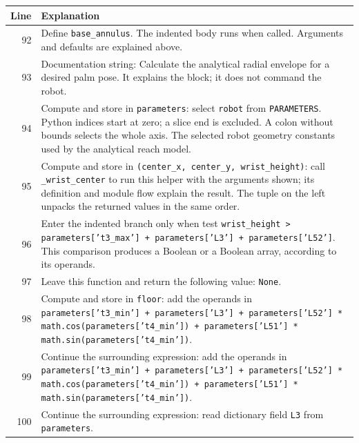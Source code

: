 \documentclass[11pt,a4paper]{book}
\begin{document}
\begin{longtable}{r p{}}

\textbf{Line} & \textbf{Explanation} \\ \hline \endhead

92 & Define \texttt{base\_annulus}. The indented body runs when called. Arguments and defaults are explained above. \\

93 & Documentation string: Calculate the analytical radial envelope for a desired palm pose. It explains the block; it does not command the robot. \\

94 & Compute and store in \texttt{parameters}: select \texttt{robot} from \texttt{PARAMETERS}. Python indices start at zero; a slice end is excluded. A colon without bounds selects the whole axis. The selected robot geometry constants used by the analytical reach model. \\

95 & Compute and store in \texttt{(center\_x, center\_y, wrist\_height)}: call \texttt{\_wrist\_center} to run this helper with the arguments shown; its definition and module flow explain the result. The tuple on the left unpacks the returned values in the same order. \\

96 & Enter the indented branch only when test \texttt{wrist\_height > parameters['t3\_max'] + parameters['L3'] + parameters['L52']}. This comparison produces a Boolean or a Boolean array, according to its operands. \\

97 & Leave this function and return the following value: \texttt{None}. \\

98 & Compute and store in \texttt{floor}: add the operands in \texttt{parameters['t3\_min'] + parameters['L3'] + parameters['L52'] * math.cos(parameters['t4\_min']) + parameters['L51'] * math.sin(parameters['t4\_min'])}.  \\

99 & Continue the surrounding expression: add the operands in \texttt{parameters['t3\_min'] + parameters['L3'] + parameters['L52'] * math.cos(parameters['t4\_min']) + parameters['L51'] * math.sin(parameters['t4\_min'])}. \\

100 & Continue the surrounding expression: read dictionary field \texttt{L3} from \texttt{parameters}. \\


\end{longtable}
\end{document}
